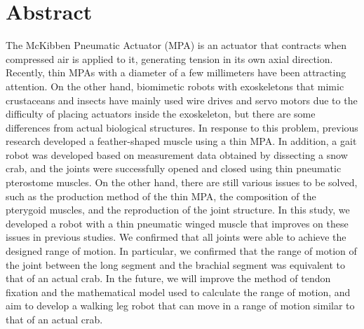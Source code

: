 \newpage
\section*{Abstract}
The McKibben Pneumatic Actuator (MPA) is an actuator that contracts when compressed air is applied to it, generating tension in its own axial direction.
Recently, thin MPAs with a diameter of a few millimeters have been attracting attention.
On the other hand, biomimetic robots with exoskeletons that mimic crustaceans and insects have mainly used wire drives and servo motors due to the difficulty of placing actuators inside the exoskeleton, but there are some differences from actual biological structures.
In response to this problem, previous research developed a feather-shaped muscle using a thin MPA. In addition, a gait robot was developed based on measurement data obtained by dissecting a snow crab, and the joints were successfully opened and closed using thin pneumatic pterostome muscles.
On the other hand, there are still various issues to be solved, such as the production method of the thin MPA, the composition of the pterygoid muscles, and the reproduction of the joint structure.
In this study, we developed a robot with a thin pneumatic winged muscle that improves on these issues in previous studies.
We confirmed that all joints were able to achieve the designed range of motion.
In particular, we confirmed that the range of motion of the joint between the long segment and the brachial segment was equivalent to that of an actual crab.
In the future, we will improve the method of tendon fixation and the mathematical model used to calculate the range of motion, and aim to develop a walking leg robot that can move in a range of motion similar to that of an actual crab.